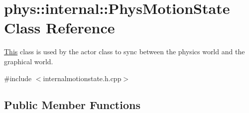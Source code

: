 \hypertarget{classphys_1_1internal_1_1PhysMotionState}{
\section{phys::internal::PhysMotionState Class Reference}
\label{dc/df8/classphys_1_1internal_1_1PhysMotionState}
}


\hyperlink{structThis}{This} class is used by the actor class to sync between the physics world and the graphical world.  




{\ttfamily \#include $<$internalmotionstate.h.cpp$>$}

\subsection*{Public Member Functions}

